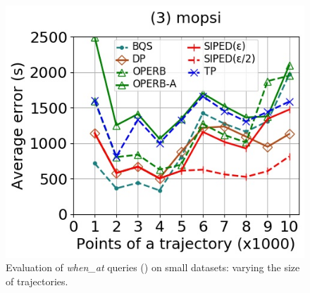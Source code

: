 {\begin{figure}[tb!]
	\includegraphics[scale=0.350]{Figures/Exp-when-PED-error-size-mopsi.jpg}		
	\vspace{-2ex}
	\caption{\small {Evaluation of \emph{when\_at} queries (\ped) on small datasets: varying the size of
			trajectories.}}
	\label{fig:query-when-ped-size}
	\vspace{-1ex}
\end{figure}

}
